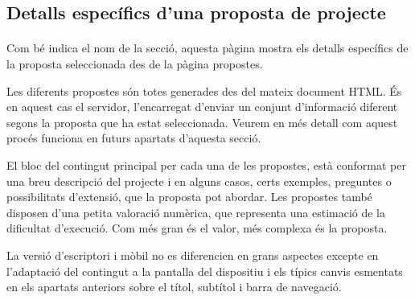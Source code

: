 \subsection{Detalls específics d'una proposta de projecte}

    \paragraph{}
    Com bé indica el nom de la secció, aquesta pàgina mostra els detalls específics de la proposta seleccionada des de la pàgina propostes.

    Les diferents propostes són totes generades des del mateix document HTML. És en aquest cas el servidor, l'encarregat d'enviar un conjunt d'informació diferent segons la proposta que ha estat seleccionada. Veurem en més detall com aquest procés funciona en futurs apartats d’aquesta secció.

    El bloc del contingut principal per cada una de les propostes, està conformat per una breu descripció del projecte i en alguns casos, certs exemples, preguntes o possibilitats d’extensió, que la proposta pot abordar. Les propostes també disposen d’una petita valoració numèrica, que representa una estimació de la dificultat d’execució. Com més gran és el valor, més complexa és la proposta.

    La versió d'escriptori i mòbil no es diferencien en grans aspectes excepte en l'adaptació del contingut a la pantalla del dispositiu i els típics canvis esmentats en els apartats anteriors sobre el títol, subtítol i barra de navegació.
